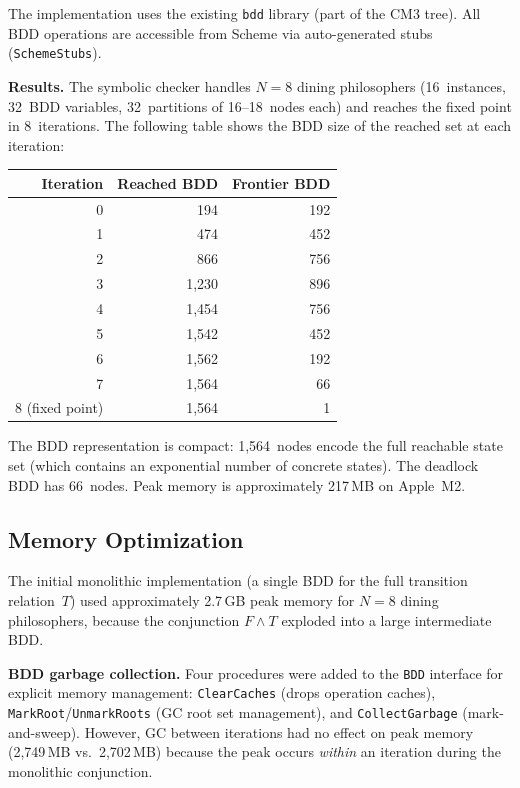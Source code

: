 \documentclass[11pt]{article}
\begin{document}
The implementation uses the existing \texttt{bdd} library (part of
the CM3 tree).  All BDD operations are accessible from Scheme via
auto-generated stubs (\texttt{SchemeStubs}).

\textbf{Results.}
The symbolic checker handles $N = 8$ dining philosophers (16~instances,
32~BDD variables, 32~partitions of 16--18~nodes each) and reaches the
fixed point in 8~iterations.  The following table shows the BDD size
of the reached set at each iteration:

\begin{center}
\begin{tabular}{rrr}
\toprule
\textbf{Iteration} & \textbf{Reached BDD} & \textbf{Frontier BDD} \\
\midrule
0 & 194 & 192 \\
1 & 474 & 452 \\
2 & 866 & 756 \\
3 & 1,230 & 896 \\
4 & 1,454 & 756 \\
5 & 1,542 & 452 \\
6 & 1,562 & 192 \\
7 & 1,564 & 66 \\
8 (fixed point) & 1,564 & 1 \\
\bottomrule
\end{tabular}
\end{center}

The BDD representation is compact: 1,564~nodes encode the full
reachable state set (which contains an exponential number of concrete
states).  The deadlock BDD has 66~nodes.  Peak memory is
approximately 217\,MB on Apple~M2.

\subsection{Memory Optimization}

The initial monolithic implementation (a single BDD for the full
transition relation~$T$) used approximately 2.7\,GB peak memory for
$N = 8$ dining philosophers, because the conjunction
$F \wedge T$ exploded into a large intermediate BDD.

\textbf{BDD garbage collection.}
Four procedures were added to the \texttt{BDD} interface for explicit
memory management: \texttt{ClearCaches} (drops operation caches),
\texttt{MarkRoot}/\texttt{UnmarkRoots} (GC root set management),
and \texttt{CollectGarbage} (mark-and-sweep).  However, GC between
iterations had no effect on peak memory (2,749\,MB vs.\ 2,702\,MB)
because the peak occurs \emph{within} an iteration during the
monolithic conjunction.
\end{document}
